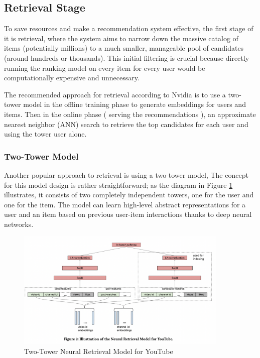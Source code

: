 \subsection{Retrieval Stage}

To save resources and make a recommendation system effective, the first stage of it is retrieval, 
where the system aims to narrow down the massive 
catalog of items (potentially millions) to a much smaller, 
manageable pool of candidates (around hundreds or thousands).
This initial filtering is crucial because 
directly running the ranking model on every item for every 
user would be computationally expensive and unnecessary.

The recommended approach for retrieval according to Nvidia \cite{NvidiaFeatureStores} is to use a two-tower model in the offline training phase to generate embeddings for users and items.
Then in the online phase ( serving the recommendations ), an approximate nearest neighbor (ANN) search to retrieve the top candidates for each user and using the tower user alone.

\subsubsection{Two-Tower Model}

Another popular approach to retrieval is using a two-tower model, 
The concept for this model design is rather straightforward; as the diagram in Figure \ref{fig:TwoTowerModel} illustrates, it consists of two completely independent towers, 
one for the user and one for the item. 
The model can learn high-level abstract representations for a user and an item 
based on previous user-item interactions thanks to deep neural networks. 

\begin{figure}[H]
    \centering
    \includegraphics[width=0.9\textwidth]{assets/two_tower.png}
    \caption[Two-Tower Neural Retrieval Model for YouTube]{Two-Tower Neural Retrieval Model for YouTube \cite{YoutubeTwoTower}}
    \label{fig:TwoTowerModel}
\end{figure}

